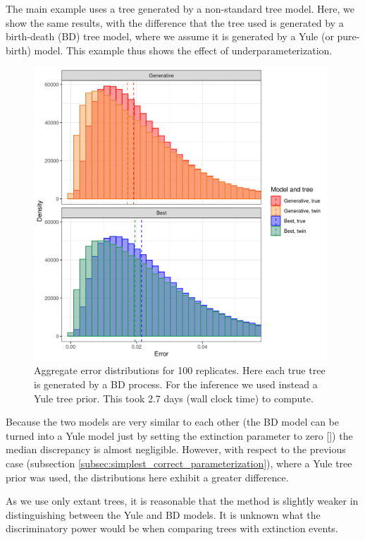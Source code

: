 The main example uses a tree generated by a non-standard tree model.
Here, we show the same results, with the difference that
the tree used is generated by a birth-death (BD) tree model,
where we assume it is generated by a Yule (or pure-birth) model.
This example thus shows the effect of underparameterization.

\begin{figure}[H]
  \includegraphics[width=0.98\textwidth]{pirouette_example_26/errors.png}
  \caption{Aggregate error distributions for 100 replicates. 
    Here each true tree is generated by a BD process. 
    For the inference we used instead a Yule tree prior. 
    This took 2.7 days (wall clock time) to compute.}
\end{figure}

Because the two models are very similar to each other (the BD model can be 
turned into a Yule model just by setting the extinction parameter to 
zero [\cite{nee1994reconstructed}]) the median discrepancy is
almost negligible. 
However, with respect to the previous 
case (subsection \ref{subsec:simplest_correct_parameterization}), 
where a Yule tree prior was used, 
the distributions here exhibit a greater difference.

As we use only extant trees, it is reasonable that the method
is slightly weaker in distinguishing between the Yule and BD
models. It is unknown what the discriminatory power would be
when comparing trees with extinction events.

